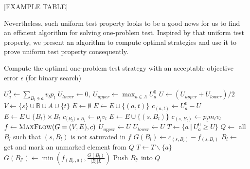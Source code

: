 \documentclass{article}
\begin{document}
[EXAMPLE TABLE]

Nevertheless, such uniform test property looks to be a good news for us to find
an efficient algorithm for solving one-problem test. Inspired by that
uniform test property, we present an algorithm to compute optimal strategies
and use it to prove uniform test property consequently.

\begin{algorithm}\label{alg:one-problem}
\caption{Compute the optimal one-problem test strategy with an acceptable
objective error $\epsilon$ (for binary search)}
\begin{algorithmic}[1]
	 
		\State $U^0_a \gets \sum_{B_l \ni a} v_l p_l$ 
	\EndFor
	\State $U_{lower} \gets 0, ~U_{upper} \gets \max_{a \in A} U^0_a$
		\State $U \gets (U_{upper}+U_{lower})/2$ 
		\State $V \gets \{s\} \cup \mathbb B \cup A \cup \{t\}$ 
		\State $E \gets \emptyset$ 
				\State $E \gets E \cup \{(a, t)\}$
				\State $c_{(a, t)} \gets U^0_a-U$ 
			\EndIf
		\EndFor
			\State $E \gets E \cup \{B_l\} \times B_l$ %
			\State $c_{\{B_l\} \times B_l} \gets p_l v_l$ 
			\State $E \gets E \cup \{(s, B_l)\}$ %
			\State $c_{(s, B_l)} \gets p_l m_l v_l$
		\EndFor
		\State $f \gets \Call{MaxFlow}{G = (V, E), c}$
			\State $U_{upper} \gets U$
		\Else
			\State $U_{lower} \gets U$
		\EndIf
	\EndWhile
	\State $T \gets \{a ~|~ U^0_a \geq U\}$
	\State $Q \gets $ all $B_l$ such that $(s, B_l)$ is not saturated in $f$
	\State $G(B_l) \gets c_{(s, B_l)}-f_{(s, B_l)}$  \label{line:first-potential}
		\State $B_l \gets $ get and mark an unmarked element from $Q$
			\State $T \gets T \backslash \{a\}$\label{line:delete-a}
				\State $G(B_{l'}) \gets \min(f_{(B_{l'},a)}, \frac{G(B_l)}{|B_l|L})$\label{line:second-potential}
				\State Push $B_{l'}$ into $Q$
			\EndFor
		\EndFor
	\EndWhile
	\State {}
\EndFunction
\end{algorithmic}
\end{algorithm}
\end{document}
